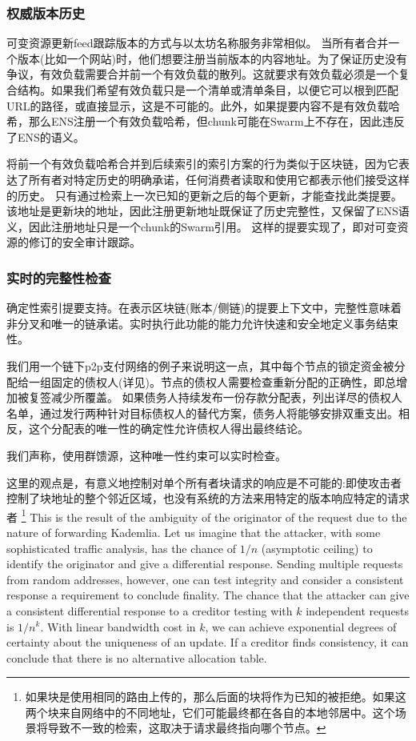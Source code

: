 \subsubsection{权威版本历史}

可变资源更新feed跟踪版本的方式与以太坊名称服务非常相似。
当所有者合并一个版本(比如一个网站)时，他们想要注册当前版本的内容地址。为了保证历史没有争议，有效负载需要合并前一个有效负载的散列。这就要求有效负载必须是一个复合结构。如果我们希望有效负载只是一个清单或清单条目，以便它可以根到匹配URL的路径，或直接显示，这是不可能的。此外，如果提要内容不是有效负载哈希，那么ENS注册一个有效负载哈希，但chunk可能在Swarm上不存在，因此违反了ENS的语义。

将前一个有效负载哈希合并到后续索引的索引方案的行为类似于区块链，因为它表达了所有者对特定历史的明确承诺，任何消费者读取和使用它都表示他们接受这样的历史。
只有通过检索上一次已知的更新之后的每个更新，才能查找此类提要。该地址是更新块的地址，因此注册更新地址既保证了历史完整性，又保留了ENS语义，因此注册地址只是一个chunk的Swarm引用。
这样的提要实现了，即对可变资源的修订的安全审计跟踪。 

\subsubsection{实时的完整性检查}

确定性索引提要支持。在表示区块链(账本/侧链)的提要上下文中，完整性意味着非分叉和唯一的链承诺。实时执行此功能的能力允许快速和安全地定义事务结束性。

我们用一个链下p2p支付网络的例子来说明这一点，其中每个节点的锁定资金被分配给一组固定的债权人(详见\cite{ethersphere2019swap})。节点的债权人需要检查重新分配的正确性，即总增加被复签减少所覆盖。
如果债务人持续发布一份存款分配表，列出详尽的债权人名单，通过发行两种针对目标债权人的替代方案，债务人将能够安排双重支出。相反，这个分配表的唯一性的确定性允许债权人得出最终结论。

我们声称，使用群馈源，这种唯一性约束可以实时检查。

这里的观点是，有意义地控制对单个所有者块请求的响应是不可能的:即使攻击者控制了块地址的整个邻近区域，也没有系统的方法来用特定的版本响应特定的请求者
%
\footnote{如果块是使用相同的路由上传的，那么后面的块将作为已知的被拒绝。如果这两个块来自网络中的不同地址，它们可能最终都在各自的本地邻居中。这个场景将导致不一致的检索，这取决于请求最终指向哪个节点。}
%
This is the result of the ambiguity of the originator of the request due to the nature of forwarding Kademlia. Let us imagine that the attacker, with some sophisticated traffic analysis, has the chance of $1/n$ (asymptotic ceiling) to identify the originator and give a differential response. Sending multiple requests from random addresses, however, one can test integrity and consider a consistent response a requirement to conclude finality. The chance that the attacker can give a consistent differential response to a creditor testing with $k$ independent requests is $1/n^k$. With linear bandwidth cost in $k$, we can achieve exponential degrees of certainty about the uniqueness of an update. If a creditor finds consistency, it can conclude that there is no alternative allocation table.


